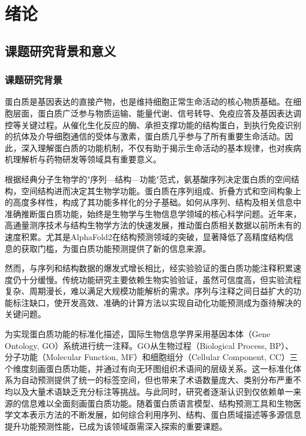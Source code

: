 
\chapter{绪论}

\section{课题研究背景和意义}

\subsection{课题研究背景}

蛋白质是基因表达的直接产物，也是维持细胞正常生命活动的核心物质基础\cite{eisenberg2000protein}。在细胞层面，蛋白质广泛参与物质运输、能量代谢、信号转导、免疫应答及基因表达调控等关键过程。从催化生化反应的酶、承担支撑功能的结构蛋白，到执行免疫识别的抗体及介导细胞通信的受体与激素，蛋白质几乎参与了所有重要生命活动。因此，深入理解蛋白质的功能机制，不仅有助于揭示生命活动的基本规律，也对疾病机理解析与药物研发等领域具有重要意义。

根据经典分子生物学的"序列—结构—功能"范式，氨基酸序列决定蛋白质的空间结构，空间结构进而决定其生物学功能。蛋白质在序列组成、折叠方式和空间构象上的高度多样性，构成了其功能多样化的分子基础。如何从序列、结构及相关信息中准确推断蛋白质功能，始终是生物学与生物信息学领域的核心科学问题。近年来，高通量测序技术与结构生物学方法的快速发展，推动蛋白质相关数据以前所未有的速度积累。尤其是AlphaFold2\cite{jumper2021highly}在结构预测领域的突破，显著降低了高精度结构信息的获取门槛，为蛋白质功能预测提供了新的信息来源。

然而，与序列和结构数据的爆发式增长相比，经实验验证的蛋白质功能注释积累速度仍十分缓慢\cite{friedberg2006automated}。传统功能研究主要依赖生物实验验证，虽然可信度高，但实验流程复杂、周期漫长，难以满足大规模功能解析的需求\cite{lin2024comprehensive}。序列与注释之间日益扩大的功能标注缺口，使开发高效、准确的计算方法以实现自动化功能预测成为亟待解决的关键问题。

为实现蛋白质功能的标准化描述，国际生物信息学界采用基因本体（Gene Ontology, GO）系统进行统一注释\cite{ashburner2000gene}。GO从生物过程（Biological Process, BP）、分子功能（Molecular Function, MF）和细胞组分（Cellular Component, CC）三个维度刻画蛋白质功能，并通过有向无环图组织术语间的层级关系。这一标准化体系为自动预测提供了统一的标签空间，但也带来了术语数量庞大、类别分布严重不均以及大量术语缺乏充分标注等挑战。与此同时，研究者逐渐认识到仅依赖单一来源的信息难以全面刻画蛋白质功能。随着蛋白质语言模型、结构预测工具和生物医学文本表示方法的不断发展，如何综合利用序列、结构、蛋白质域描述等多源信息提升功能预测性能，已成为该领域亟需深入探索的重要课题。

